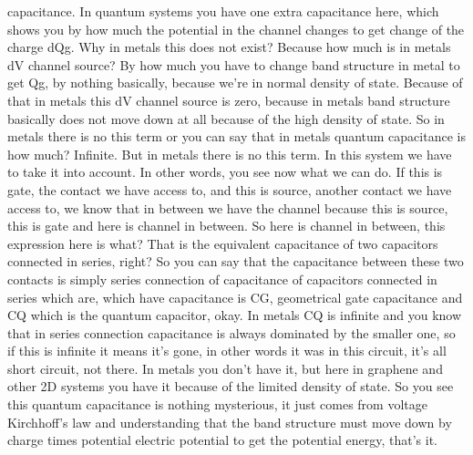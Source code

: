 capacitance. In quantum systems you have one extra capacitance here, which shows you by how much the potential in the channel changes to get change of the charge dQg. Why in metals this does not exist? Because how much is in metals dV channel source? By how much you have to change band structure in metal to get Qg, by nothing basically, because we're in normal density of state. Because of that in metals this dV channel source is zero, because in metals band structure basically does not move down at all because of the high density of state. So in metals there is no this term or you can say that in metals quantum capacitance is how much? Infinite. But in metals there is no this term. In this system we have to take it into account. In other words, you see now what we can do. If this is gate, the contact we have access to, and this is source, another contact we have access to, we know that in between we have the channel because this is source, this is gate and here is channel in between. So here is channel in between, this expression here is what? That is the equivalent capacitance of two capacitors connected in series, right? So you can say that the capacitance between these two contacts is simply series connection of capacitance of capacitors connected in series which are, which have capacitance is CG, geometrical gate capacitance and CQ which is the quantum capacitor, okay. In metals CQ is infinite and you know that in series connection capacitance is always dominated by the smaller one, so if this is infinite it means it's gone, in other words it was in this circuit, it's all short circuit, not there. In metals you don't have it, but here in graphene and other 2D systems you have it because of the limited density of state. So you see this quantum capacitance is nothing mysterious, it just comes from voltage Kirchhoff's law and understanding that the band structure must move down by charge times potential electric potential to get the potential energy, that's it.